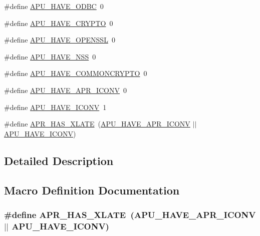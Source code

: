 \begin{DoxyCompactItemize}
\item 
\#define \hyperlink{group__APR__Util_ga74a67f0582a8e83bc8dbe62dd6d5fd8a}{A\+P\+U\+\_\+\+H\+A\+V\+E\+\_\+\+O\+D\+BC}~0
\item 
\#define \hyperlink{group__APR__Util_ga593ff66e818403a6946ae379b0343f55}{A\+P\+U\+\_\+\+H\+A\+V\+E\+\_\+\+C\+R\+Y\+P\+TO}~0
\item 
\#define \hyperlink{group__APR__Util_ga1d00285ed9100b098da3d3ea4aa05d14}{A\+P\+U\+\_\+\+H\+A\+V\+E\+\_\+\+O\+P\+E\+N\+S\+SL}~0
\item 
\#define \hyperlink{group__APR__Util_gaca13a174095a8289b43d93526a4c4eeb}{A\+P\+U\+\_\+\+H\+A\+V\+E\+\_\+\+N\+SS}~0
\item 
\#define \hyperlink{group__APR__Util_ga0711651539f30c68ab121b4886bc5650}{A\+P\+U\+\_\+\+H\+A\+V\+E\+\_\+\+C\+O\+M\+M\+O\+N\+C\+R\+Y\+P\+TO}~0
\item 
\#define \hyperlink{group__APR__Util_ga05728c17575e69d12092d21e47065610}{A\+P\+U\+\_\+\+H\+A\+V\+E\+\_\+\+A\+P\+R\+\_\+\+I\+C\+O\+NV}~0
\item 
\#define \hyperlink{group__APR__Util_ga93b33ec545cbfd5ba93aa0104e197b01}{A\+P\+U\+\_\+\+H\+A\+V\+E\+\_\+\+I\+C\+O\+NV}~1
\item 
\#define \hyperlink{group__APR__Util_ga1a88ee138f0f70a6dca12bc8415d8db4}{A\+P\+R\+\_\+\+H\+A\+S\+\_\+\+X\+L\+A\+TE}~(\hyperlink{group__APR__Util_ga05728c17575e69d12092d21e47065610}{A\+P\+U\+\_\+\+H\+A\+V\+E\+\_\+\+A\+P\+R\+\_\+\+I\+C\+O\+NV} $\vert$$\vert$ \hyperlink{group__APR__Util_ga93b33ec545cbfd5ba93aa0104e197b01}{A\+P\+U\+\_\+\+H\+A\+V\+E\+\_\+\+I\+C\+O\+NV})
\end{DoxyCompactItemize}


\subsection{Detailed Description}


\subsection{Macro Definition Documentation}
\subsubsection[{\texorpdfstring{A\+P\+R\+\_\+\+H\+A\+S\+\_\+\+X\+L\+A\+TE}{APR_HAS_XLATE}}]{\setlength{\rightskip}{0pt plus 5cm}\#define A\+P\+R\+\_\+\+H\+A\+S\+\_\+\+X\+L\+A\+TE~({\bf A\+P\+U\+\_\+\+H\+A\+V\+E\+\_\+\+A\+P\+R\+\_\+\+I\+C\+O\+NV} $\vert$$\vert$ {\bf A\+P\+U\+\_\+\+H\+A\+V\+E\+\_\+\+I\+C\+O\+NV})}\hypertarget{group__APR__Util_ga1a88ee138f0f70a6dca12bc8415d8db4}{}\label{group__APR__Util_ga1a88ee138f0f70a6dca12bc8415d8db4}
